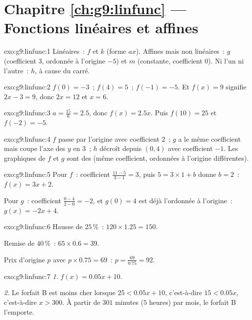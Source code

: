 \section*{Chapitre \ref{ch:g9:linfunc} --- Fonctions linéaires et affines}

\begin{solution}{exo:g9:linfunc:1}
Linéaires~: $f$ et $k$ (forme $ax$). Affines mais non linéaires~: $g$
(coefficient $3$, ordonnée à l'origine $-5$) et $m$ (constante,
coefficient $0$). Ni l'un ni l'autre~: $h$, à cause du carré.
\end{solution}

\begin{solution}{exo:g9:linfunc:2}
$f(0) = -3$~; $f(4) = 5$~; $f(-1) = -5$. Et $f(x) = 9$ signifie
$2x - 3 = 9$, donc $2x = 12$ et $x = 6$.
\end{solution}

\begin{solution}{exo:g9:linfunc:3}
$a = \frac{15}{6} = 2.5$, donc $f(x) = 2.5x$. Puis $f(10) = 25$ et
$f(-2) = -5$.
\end{solution}

\begin{solution}{exo:g9:linfunc:4}
$f$ passe par l'origine avec coefficient $2$~; $g$ a le même coefficient
mais coupe l'axe des $y$ en $3$~; $h$ décroît depuis $(0, 4)$ avec
coefficient $-1$. Les graphiques de $f$ et $g$ sont des \emph{} (même coefficient, ordonnées à l'origine différentes).
\end{solution}

\begin{solution}{exo:g9:linfunc:5}
Pour $f$~: coefficient $\frac{11 - 5}{3 - 1} = 3$, puis
$5 = 3 \times 1 + b$ donne $b = 2$~: $f(x) = 3x + 2$.

Pour $g$~: coefficient $\frac{0 - 4}{2 - 0} = -2$, et $g(0) = 4$ est
déjà l'ordonnée à l'origine~: $g(x) = -2x + 4$.
\end{solution}

\begin{solution}{exo:g9:linfunc:6}
Hausse de $25\,\%$~: $120 \times 1.25 = 150$.

Remise de $40\,\%$~: $65 \times 0.6 = 39$.

Prix d'origine $p$ avec $p \times 0.75 = 69$~:
$p = \frac{69}{0.75} = 92$.
\end{solution}

\begin{solution}{exo:g9:linfunc:7}
\emph{1.} $f(x) = 0.05x + 10$.

\emph{2.} Le forfait B est moins cher lorsque $25 < 0.05x + 10$,
c'est-à-dire $15 < 0.05x$, c'est-à-dire $x > 300$. À partir de $301$
minutes ($5$ heures) par mois, le forfait B l'emporte.
\end{solution}

